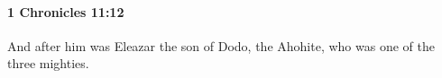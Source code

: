 
		\paragraph{1 Chronicles 11:12} %
			\label{1CHRONICLES-11-12}

			And after him was Eleazar the son of Dodo, the Ahohite, who was one of the three mighties.


